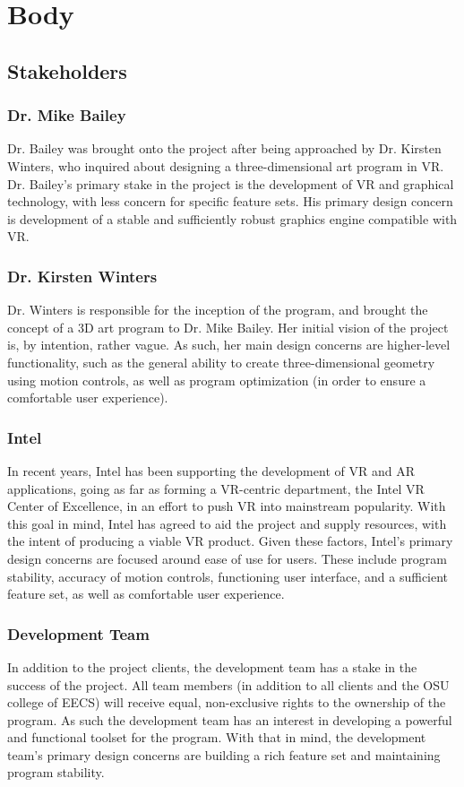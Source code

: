 \documentclass[onecolumn, draftclsnofoot,10pt, compsoc]{IEEEtran}
\begin{document}
\section{Body}

\subsection{Stakeholders}

\subsubsection{Dr. Mike Bailey}
Dr. Bailey was brought onto the project after being approached by Dr. Kirsten Winters, who inquired about designing a three-dimensional art program in VR. Dr. Bailey’s primary stake in the project is the development of VR and graphical technology, with less concern for specific feature sets. His primary design concern is development of a stable and sufficiently robust graphics engine compatible with VR.
\subsubsection{Dr. Kirsten Winters}
Dr. Winters is responsible for the inception of the program, and brought the concept of a 3D art program to Dr. Mike Bailey. Her initial vision of the project is, by intention, rather vague. As such, her main design concerns are higher-level functionality, such as the general ability to create three-dimensional geometry using motion controls, as well as program optimization (in order to ensure a comfortable user experience).
\subsubsection{Intel}
In recent years, Intel has been supporting the development of VR and AR applications, going as far as forming a VR-centric department, the Intel VR Center of Excellence, in an effort to push VR into mainstream popularity. With this goal in mind, Intel has agreed to aid the project and supply resources, with the intent of producing a viable VR product. Given these factors, Intel’s primary design concerns are focused around ease of use for users. These include program stability, accuracy of motion controls, functioning user interface, and a sufficient feature set, as well as comfortable user experience. 
\subsubsection{Development Team}
In addition to the project clients, the development team has a stake in the success of the project. All team members (in addition to all clients and the OSU college of EECS) will receive equal, non-exclusive rights to the ownership of the program. As such the development team has an interest in developing a powerful and functional toolset for the program. With that in mind, the development team’s primary design concerns are building a rich feature set and maintaining program stability.
\end{document}
